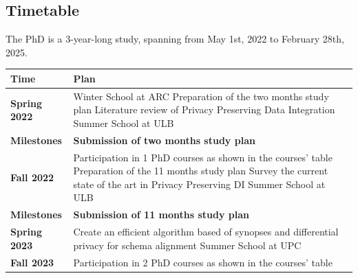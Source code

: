 \documentclass[12pt]{article}
\begin{document}
\subsection{Timetable}
The PhD is a 3-year-long study, spanning from May 1st, 2022 to February 28th, 2025.
\begin{table}[h]
   \centering
   \begin{tabular}{lp{}}
       \textbf{Time}        & \textbf{Plan}                                                               \\
       \toprule
       \textbf{Spring 2022}   &
       Winter School at ARC \newline
       Preparation of the two months study plan                         \newline
       Literature review of Privacy Preserving Data Integration    \newline
       Summer School at ULB \\
       \textbf{Milestones}  &
       \textbf{Submission of two months study plan}                                                       \\
       \midrule
       \textbf{Fall 2022} &
       Participation in 1 PhD courses as shown in the courses' table \newline
       Preparation of the 11 months study plan \newline
       Survey the current state of the art in Privacy Preserving DI \newline
       Summer School at ULB \\
       \textbf{Milestones}  &
       \textbf{Submission of 11 months study plan}                                                        \\
       \midrule
       \textbf{Spring 2023}   &
       Create an efficient algorithm based of synopses and differential privacy for schema alignment \newline
       Summer School at UPC                                                                               \\
       \midrule
       \textbf{Fall 2023} &
       Participation in 2 PhD courses as shown in the courses' table \newline

\end{tabular}
\end{table}
\end{document}
